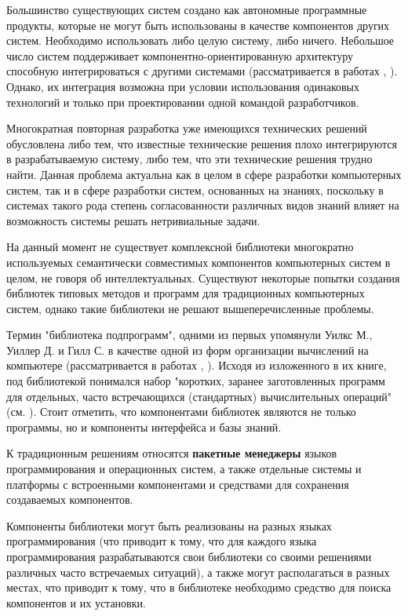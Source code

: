 Большинство существующих систем создано как автономные программные продукты, которые не могут быть использованы в качестве компонентов других систем. Необходимо использовать либо целую систему, либо ничего. Небольшое число систем поддерживает компонентно-ориентированную архитектуру способную интегрироваться с другими системами (рассматривается в работах , ). Однако, их интеграция возможна при условии использования одинаковых технологий и только при проектировании одной командой разработчиков.

Многократная повторная разработка уже имеющихся технических решений обусловлена либо тем, что известные технические решения плохо интегрируются в разрабатываемую систему, либо тем, что эти технические решения трудно найти. Данная проблема актуальна как в целом в сфере разработки компьютерных систем, так и в сфере разработки систем, основанных на знаниях, поскольку в системах такого рода степень согласованности различных видов знаний влияет на возможность системы решать нетривиальные задачи.

На данный момент не существует комплексной библиотеки многократно используемых семантически совместимых компонентов компьютерных систем в целом, не говоря об интеллектуальных. Существуют некоторые попытки создания библиотек типовых методов и программ для традиционных компьютерных систем, однако такие библиотеки не решают вышеперечисленные проблемы.

Термин "библиотека подпрограмм"{}, одними из первых упомянули Уилкс М., Уиллер Д. и Гилл С. в качестве одной из форм организации вычислений на компьютере (рассматривается в работах , ). Исходя из изложенного в их книге, под библиотекой понимался набор "коротких, заранее заготовленных программ для отдельных, часто встречающихся (стандартных) вычислительных операций"{} (см. ). Стоит отметить, что компонентами библиотек являются не только программы, но и компоненты интерфейса и базы знаний.

К традиционным решениям относятся \textbf{пакетные менеджеры} языков программирования и операционных систем, а также отдельные системы и платформы с встроенными компонентами и средствами для сохранения создаваемых компонентов.

Компоненты библиотеки могут быть реализованы на разных языках программирования (что приводит к тому, что для каждого языка программирования разрабатываются свои библиотеки со своими решениями различных часто встречаемых ситуаций), а также могут располагаться в разных местах, что приводит к тому, что в библиотеке необходимо средство для поиска компонентов и их установки.

